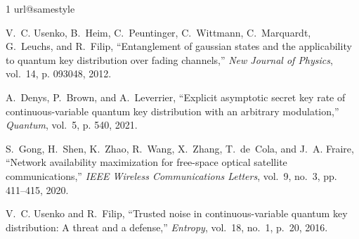 \documentclass[conference,a4paper]{IEEEtran}
\begin{document}
\begin{thebibliography}{1}
\providecommand{\url}[1]{#1}
\csname url@samestyle\endcsname
\providecommand{\newblock}{\relax}
\providecommand{\bibinfo}[2]{#2}
\providecommand{\BIBentrySTDinterwordspacing}{\spaceskip=0pt\relax}
\providecommand{\BIBentryALTinterwordstretchfactor}{4}
\providecommand{\BIBentryALTinterwordspacing}{\spaceskip=\fontdimen2\font plus
\BIBentryALTinterwordstretchfactor\fontdimen3\font minus
  \fontdimen4\font\relax}
\providecommand{\BIBforeignlanguage}[2]{{%
\expandafter\ifx\csname l@#1\endcsname\relax
\typeout{** WARNING: IEEEtran.bst: No hyphenation pattern has been}%
\typeout{** loaded for the language `#1'. Using the pattern for}%
\typeout{** the default language instead.}%
\else
\language=\csname l@#1\endcsname
\fi
#2}}
\providecommand{\BIBdecl}{\relax}
\BIBdecl

V.~C. Usenko, B.~Heim, C.~Peuntinger, C.~Wittmann, C.~Marquardt, G.~Leuchs, and
  R.~Filip, ``Entanglement of gaussian states and the applicability to quantum
  key distribution over fading channels,'' \emph{New Journal of Physics},
  vol.~14, p. 093048, 2012.

A.~Denys, P.~Brown, and A.~Leverrier, ``Explicit asymptotic secret key rate of
  continuous-variable quantum key distribution with an arbitrary modulation,''
  \emph{Quantum}, vol.~5, p. 540, 2021.

S.~Gong, H.~Shen, K.~Zhao, R.~Wang, X.~Zhang, T.~de~Cola, and J.~A. Fraire,
  ``Network availability maximization for free-space optical satellite
  communications,'' \emph{IEEE Wireless Communications Letters}, vol.~9, no.~3,
  pp. 411--415, 2020.

V.~C. Usenko and R.~Filip, ``Trusted noise in continuous-variable quantum key
  distribution: A threat and a defense,'' \emph{Entropy}, vol.~18, no.~1,
  p.~20, 2016.

\end{thebibliography}
\end{document}
